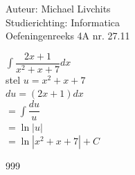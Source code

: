 \documentclass[a4paper]{article}
\begin{document}
  
\noindent \large Auteur: Michael Livchits \\
\noindent \large Studierichting: Informatica\\
\noindent \large Oefeningenreeks 4A nr. 27.11\\

\medskip

\normalsize

$\displaystyle\int\dfrac{2x+1}{x^2+x+7}dx$\\

stel $u = x^2+x+7$\\

$du = (2x+1)dx$\\

$= \displaystyle\int\dfrac{du}{u}$\\

$= \ln |u|$\\

$= \ln |x^2+x+7| + C$\\


\begin{thebibliography}{999}
\end{thebibliography}
\end{document}
